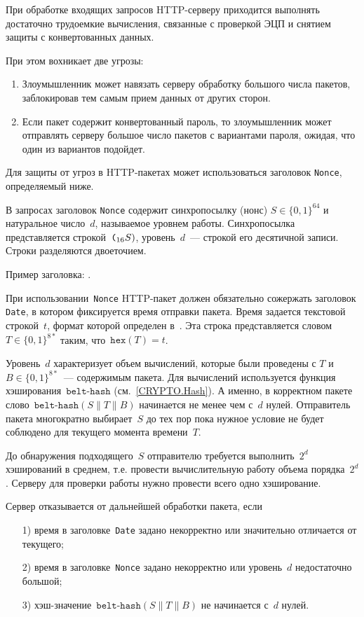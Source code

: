 При обработке входящих запросов HTTP-серверу приходится выполнять 
достаточно трудоемкие вычисления, связанные с проверкой ЭЦП и снятием 
защиты с конвертованных данных.

При этом вохникает две угрозы:
\begin{enumerate}
\item
Злоумышленник может навязать серверу обработку большого числа пакетов, 
заблокировав тем самым прием данных от других сторон. 
\item
Если пакет содержит конвертованный пароль, то злоумышленник может 
отправлять серверу большое число пакетов с вариантами пароля, ожидая, что 
один из вариантов подойдет. 
\end{enumerate}

Для защиты от угроз в HTTP-пакетах может использоваться заголовок 
\texttt{Nonce}, определяемый ниже. 

В запросах заголовок \texttt{Nonce} содержит синхропосылку (нонс) 
$S\in\{0,1\}^64$ и натуральное число~$d$, называемое уровнем работы. 
Синхропосылка представляется строкой~$\texttt{(}_{16}S)$, уровень~$d$~--- 
строкой его десятичной записи. Строки разделяются двоеточием.

Пример заголовка: .

При использовании~\texttt{Nonce} HTTP-пакет должен обязательно 
сожержать заголовок \texttt{Date}, в котором фиксируется 
время отправки пакета. Время задается текстовой строкой~$t$, формат которой 
определен в~\cite{HTTP}. Эта строка представляется 
словом~$T\in\{0,1\}^{8*}$ таким, что~$\texttt{hex}(T)=t$.

Уровень~$d$ характеризует объем вычислений, которые были проведены
с $T$ и~$B\in\{0,1\}^{8*}$~--- содержимым пакета.
Для вычислений используется функция хэширования~$\texttt{belt-hash}$
(см.~\ref{CRYPTO.Hash}). А именно, в корректном пакете 
слово~$\texttt{belt-hash}(S\parallel T\parallel B)$ начинается не менее 
чем с~$d$ нулей.
%
Отправитель пакета многократно выбирает~$S$ до тех пор пока нужное условие 
не будет соблюдено для текущего момента времени~$T$.

До обнаружения подходящего~$S$ отправителю требуется выполнить~$2^d$ 
хэширований в среднем, т.е. провести вычислительную работу объема 
порядка~$2^d$. Серверу для проверки работы нужно провести всего одно 
хэширование. 

Сервер отказывается от дальнейшей обработки пакета, если
\begin{enumerate}
\item[1)] 
время в заголовке~\texttt{Date} задано некорректно или значительно 
отличается от текущего;
\item[2)] 
время в заголовке~\texttt{Nonce} задано некорректно или уровень~$d$ недостаточно
большой;
\item[3)] 
хэш-значение~$\texttt{belt-hash}(S\parallel T\parallel B)$ не начинается с~$d$ нулей.
\end{enumerate}

